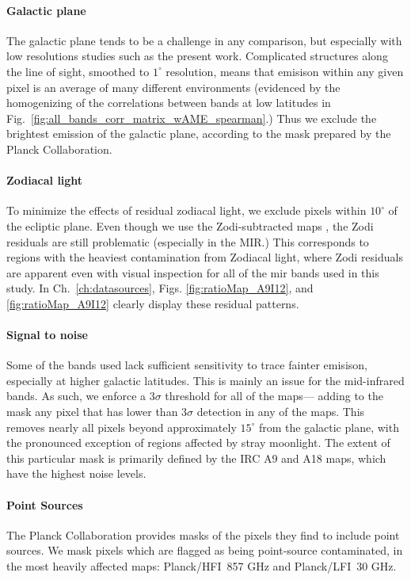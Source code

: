         \paragraph{Galactic plane}
          The galactic plane tends to be a challenge in any comparison, but especially with low resolutions studies such as the present work. Complicated structures along the line of sight, smoothed to $1^{\circ}$ resolution, means that emisison within any given pixel is an average of many different environments (evidenced by the homogenizing of the correlations between bands at low latitudes in Fig.~\ref{fig:all_bands_corr_matrix_wAME_spearman}.) Thus we exclude the brightest emission of the galactic plane, according to the mask prepared by the Planck Collaboration.

        \paragraph{Zodiacal light}
          To minimize the effects of residual zodiacal light, we exclude pixels within $10^{\circ}$ of the ecliptic plane.  Even though we use the Zodi-subtracted maps \citep{kelsall98, kondo16, ootsubo16}, the Zodi residuals are still problematic (especially in the MIR.) This corresponds to regions with the heaviest contamination from Zodiacal light, where Zodi residuals are apparent even with visual inspection for all of the \gls{mir} bands used in this study. In Ch.~\ref{ch:datasources}, Figs. \ref{fig:ratioMap_A9I12}, and \ref{fig:ratioMap_A9I12} clearly display these residual patterns.

        \paragraph{Signal to noise}
          Some of the bands used lack sufficient sensitivity to trace fainter emisison, especially at higher galactic latitudes. This is mainly an issue for the mid-infrared bands. As such, we enforce a 3$\sigma$ threshold for all of the maps--- adding to the mask any pixel that has lower than 3$\sigma$ detection in any of the maps. This removes nearly all pixels beyond approximately $15^{\circ}$ from the galactic plane, with the pronounced exception of regions affected by stray moonlight. The extent of this particular mask is primarily defined by the IRC A9 and A18 maps, which have the highest noise levels.

       \paragraph{Point Sources}
         The Planck Collaboration provides masks of the pixels they find to include point sources. We mask pixels which are flagged as being point-source contaminated, in the most heavily affected maps: Planck/HFI~857 GHz and Planck/LFI~30 GHz.

